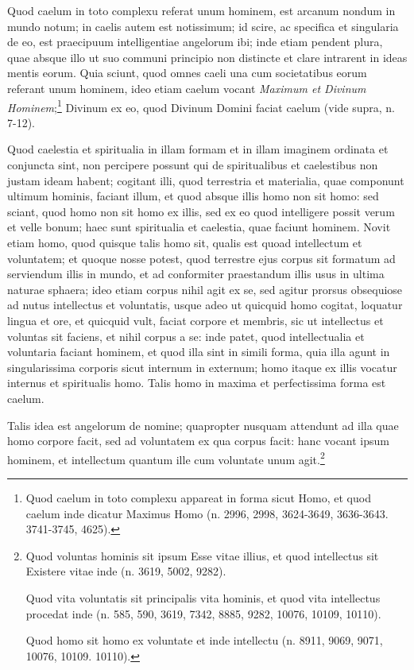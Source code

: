 
\begin{topic}{59}
    Quod caelum in toto complexu referat unum hominem, est arcanum nondum in mundo notum; in caelis autem est
    notissimum; id scire, ac specifica et singularia de eo, est praecipuum intelligentiae angelorum ibi; inde etiam
    pendent plura, quae absque illo ut suo communi principio non distincte et clare intrarent in ideas mentis eorum.
    Quia sciunt, quod omnes caeli una cum societatibus eorum referant unum hominem, ideo etiam caelum vocant
    \emph{Maximum et Divinum Hominem};\footnote{Quod caelum in toto complexu appareat in forma sicut Homo, et quod
    caelum inde dicatur Maximus Homo (n. 2996, 2998, 3624-3649, 3636-3643. 3741-3745, 4625).} Divinum ex eo, quod
    Divinum Domini faciat caelum (vide supra, n. 7-12).
\end{topic}

\begin{topic}{60}
    Quod caelestia et spiritualia in illam formam et in illam imaginem ordinata et conjuncta sint, non percipere possunt
    qui de spiritualibus et caelestibus non justam ideam habent; cogitant illi, quod terrestria et materialia, quae
    componunt ultimum hominis, faciant illum, et quod absque illis homo non sit homo: sed sciant, quod homo non sit homo
    ex illis, sed ex eo quod intelligere possit verum et velle bonum; haec sunt spiritualia et caelestia, quae faciunt
    hominem.
    Novit etiam homo, quod quisque talis homo sit, qualis est quoad intellectum et voluntatem; et quoque nosse potest,
    quod terrestre ejus corpus sit formatum ad serviendum illis in mundo, et ad conformiter praestandum illis usus in
    ultima naturae sphaera; ideo etiam corpus nihil agit ex se, sed agitur prorsus obsequiose ad nutus intellectus et
    voluntatis, usque adeo ut quicquid homo cogitat, loquatur lingua et ore, et quicquid vult, faciat corpore et
    membris, sic ut intellectus et voluntas sit faciens, et nihil corpus a se: inde patet, quod intellectualia et
    voluntaria faciant hominem, et quod illa sint in simili forma, quia illa agunt in singularissima corporis sicut
    internum in externum; homo itaque ex illis vocatur internus et spiritualis homo.
    Talis homo in maxima et perfectissima forma est caelum.
\end{topic}

\begin{topic}{61}
    Talis idea est angelorum de nomine; quapropter nusquam attendunt ad illa quae homo corpore facit, sed ad voluntatem
    ex qua corpus facit: hanc vocant ipsum hominem, et intellectum quantum ille cum voluntate unum agit.\footnote{Quod
    voluntas hominis sit ipsum Esse vitae illius, et quod intellectus sit Existere vitae inde (n. 3619, 5002, 9282).

    Quod vita voluntatis sit principalis vita hominis, et quod vita intellectus procedat inde (n. 585, 590, 3619, 7342,
    8885, 9282, 10076, 10109, 10110).

    Quod homo sit homo ex voluntate et inde intellectu (n. 8911, 9069, 9071, 10076, 10109. 10110).}
\end{topic}

